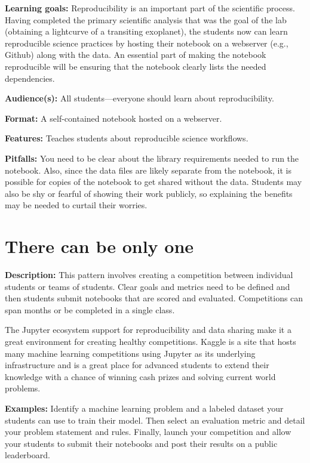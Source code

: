 \documentclass[]{book}
\begin{document}
\textbf{Learning goals:}
Reproducibility is an important part of the scientific process. Having completed
the primary scientific analysis that was the goal of the lab (obtaining a lightcurve
of a transiting exoplanet), the students now can learn reproducible science practices
by hosting their notebook on a webserver (e.g., Github) along with the data.
An essential part of making the notebook reproducible will be ensuring that the
notebook clearly lists the needed dependencies.

\textbf{Audience(s):}
All students---everyone should learn about reproducibility.

\textbf{Format:}
A self-contained notebook hosted on a webserver.

\textbf{Features:}
Teaches students about reproducible science workflows.

\textbf{Pitfalls:}
You need to be clear about the library requirements needed to run the notebook.
Also, since the data files are likely separate from the notebook, it is possible
for copies of the notebook to get shared without the data. Students may also be
shy or fearful of showing their work publicly, so explaining the benefits may
be needed to curtail their worries.

\hypertarget{there-can-be-only-one}{%
\section{There can be only one}\label{there-can-be-only-one}}

\textbf{Description:}
This pattern involves creating a competition between individual students or
teams of students. Clear goals and metrics need to be defined and then students
submit notebooks that are scored and evaluated. Competitions can span months or
be completed in a single class.

The Jupyter ecosystem support for reproducibility and data sharing make it a
great environment for creating healthy competitions. Kaggle is a site that
hosts many machine learning competitions using Jupyter as its underlying
infrastructure and is a great place for advanced students to extend their
knowledge with a chance of winning cash prizes and solving current world
problems.

\textbf{Examples:}
Identify a machine learning problem and a labeled dataset your students can use
to train their model. Then select an evaluation metric and detail your problem
statement and rules. Finally, launch your competition and allow your students
to submit their notebooks and post their results on a public leaderboard.
\end{document}
